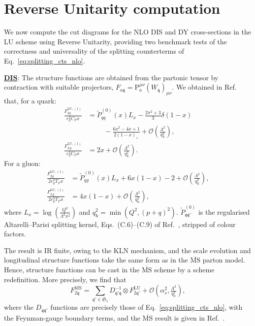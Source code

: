 \documentclass[%
 reprint,
 amsmath,amssymb,
 superscriptaddress,
 aps,
 preprintnumbers,
prl,
floatfix,
]{revtex4-2}
\let\label\latexKernelLabel
\begin{document}
\section{Reverse Unitarity computation}
\label{sec:reverse-unitarity}

We now compute the cut diagrams for the NLO DIS and DY cross-sections in the LU scheme using Reverse Unitarity, providing two benchmark tests of the correctness and universality of the splitting counterterms of Eq.~\eqref{eq:splitting_cts_nlo}.

\underline{\textbf{DIS}}: The structure functions are obtained from the partonic tensor by contraction with suitable projectors, $F_{a\mathfrak{q}}=\mathrm{P}_a^{\mu\nu}(W_{\mathfrak{q}})_{\mu\nu}$.
We obtained in Ref.~\cite{Capatti:2025gqj} that, for a quark:
\begin{align}
\frac{F_{2q}^{\text{LU},(1)}}{e_q^2C_F x}
&=
\tilde{P}_{qq}^{(0)}(x)L_x-\frac{2\pi^2+3}{3}\delta(1-x)
\nonumber\\
&\hspace{1cm}
-\frac{6x^2-4x+1}{2(1-x)_+}
+\mathcal{O}\left(\tfrac{\Lambda^2}{q^2_{\text{h}}}\right),
\\
\frac{F_{Lq}^{\text{LU},(1)}}{e_q^2C_F x}
&= 2x+\mathcal{O}\left(\tfrac{\Lambda^2}{q^2_{\text{h}}}\right).
\end{align}
For a gluon:
\begin{align}
\frac{F_{2g}^{\text{LU},(1)}}{2e_q^2 T_F x}&= \tilde{P}_{qg}^{(0)}(x)L_x+6x(1-x)-2+\mathcal{O}\left(\tfrac{\Lambda^2}{q^2_{\text{h}}}\right), \\
\frac{F_{Lg}^{\text{LU},(1)}}{2e_q^2 T_F x}&=4  x(1-x)+\mathcal{O}\left(\tfrac{\Lambda^2}{q^2_{\text{h}}}\right),
\end{align}
where $L_x=\log\left(\tfrac{Q^2}{\Lambda^2 x^2}\right)$ and $q_{\mathrm{h}}^2=\min(Q^2,(p+q)^2)$.
$\tilde{P}^{(0)}_{\mathfrak{q}\mathfrak{q}'}$ is the regularised Altarelli--Parisi splitting kernel, Eqs.~(C.6)--(C.9) of Ref.~\cite{Catani_1997}, stripped of colour factors.



The result is IR finite, owing to the KLN mechanism, and the scale evolution and longitudinal structure functions take the same form as in the $\overline{\text{MS}}$ parton model.
Hence, structure functions can be cast in the $\overline{\text{MS}}$ scheme by a scheme redefinition.
More precisely, we find that
\begin{equation}
F_{2\mathfrak{q}}^{\overline{\text{MS}}}=\sum_{\mathfrak{q}'\in\mathfrak{S}_1}D^{-1}_{\mathfrak{q}'\mathfrak{q}}\otimes F_{2\mathfrak{q}'}^{\text{LU}}+\mathcal{O}\left(\alpha_s^2,\tfrac{\Lambda^2}{q^2_{\text{h}}}\right),
\end{equation}
where the $D_{\mathfrak{q} \mathfrak{q}'}$ functions are precisely those of Eq.~\eqref{eq:splitting_cts_nlo}, with the Feynman-gauge boundary terms, and the $\overline{\text{MS}}$ result is given in Ref.~\cite{Bardeen:1978yd}.
\end{document}
